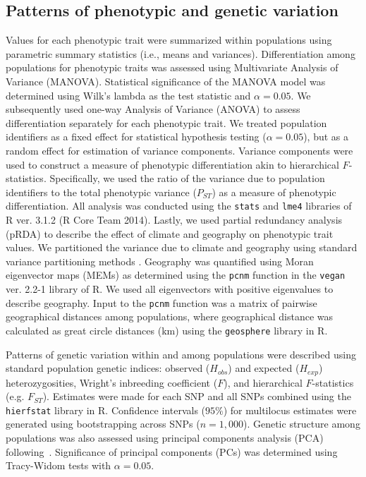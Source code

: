 \documentclass[fleqn,11pt]{wlpeerj}
\begin{document}
\subsection*{Patterns of phenotypic and genetic variation}

Values for each phenotypic trait were summarized  within populations using
parametric summary statistics (i.e., means and variances). Differentiation among
populations for phenotypic traits was assessed using Multivariate Analysis of
Variance (MANOVA). Statistical significance of the MANOVA model was determined
using Wilk's lambda as the test statistic and $\alpha = 0.05$. We subsequently
used one-way Analysis of Variance (ANOVA) to assess differentiation separately
for each phenotypic trait. We treated population identifiers as a fixed effect
for statistical hypothesis testing ($\alpha = 0.05$), but as a random effect for
estimation of variance components. Variance components were used to construct a
measure of phenotypic differentiation akin to hierarchical $F$-statistics.
Specifically, we used the ratio of the variance due to population identifiers to
the total phenotypic variance ($P_{ST}$) as a measure of phenotypic
differentiation. All analysis was conducted using the \texttt{stats} and
\texttt{lme4} libraries of R ver. 3.1.2 (R Core Team 2014). Lastly, we used
partial redundancy analysis (pRDA) to describe the effect of climate and
geography on phenotypic trait values. We partitioned the variance due to climate
and geography using standard variance partitioning methods \citep{Borcard:1992}.
Geography was quantified using Moran eigenvector maps (MEMs) as determined using
the \texttt{pcnm} function in the \texttt{vegan} ver. 2.2-1 library of R. We
used all eigenvectors with positive eigenvalues to describe geography. Input to
the \texttt{pcnm} function was a matrix of pairwise geographical distances among
populations, where geographical distance was calculated as great circle
distances (km) using the \texttt{geosphere} library in R.

Patterns of genetic variation within and among populations were described using
standard population genetic indices: observed ($H_{obs}$) and expected
($H_{exp}$) heterozygosities, Wright's inbreeding coefficient ($F$), and
hierarchical $F$-statistics (e.g. $F_{ST}$). Estimates were made for each SNP
and all SNPs combined using the \texttt{hierfstat} library in R. Confidence
intervals ($95\%$) for multilocus estimates were generated using bootstrapping
across SNPs ($n = 1,000$). Genetic structure among populations was also assessed
using principal components analysis (PCA) following~\cite{Patterson:2006}.
Significance of principal components (PCs) was determined using Tracy-Widom tests
with $\alpha = 0.05$.
\end{document}
